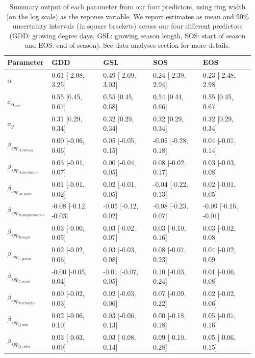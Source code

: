 \begin{table}[ht]
\centering
\caption{Summary output of each parameter from our four predictors, using ring width (on the log scale) as the reponse variable. We report estimates as mean and 90\% uncertainty intervals (in square brackets) across our four different predictors (GDD: growing degree days, GSL: growing season length, SOS: start of season and EOS: end of season). See data analyses section for more details.} 
\label{tab:tab_all}
\begin{tabular}{lllll}
  \hline
Parameter & GDD & GSL & SOS & EOS \\ 
  \hline
$\alpha$ & 0.61 [-2.08, 3.25] & 0.49 [-2.09, 3.03] & 0.24 [-2.39, 2.94] & 0.23 [-2.48, 2.98] \\ 
  $\sigma_{\alpha_{tree}}$ & 0.55 [0.45, 0.67] & 0.55 [0.45, 0.68] & 0.54 [0.44, 0.66] & 0.55 [0.45, 0.67] \\ 
  $\sigma_{y}$ & 0.31 [0.29, 0.34] & 0.32 [0.29, 0.34] & 0.32 [0.29, 0.34] & 0.32 [0.29, 0.34] \\ 
  $\beta_{spp_{A. rubrum}}$ & 0.00 [-0.06, 0.06] & 0.05 [-0.05, 0.15] & -0.05 [-0.28, 0.18] & 0.04 [-0.07, 0.14] \\ 
  $\beta_{spp_{A. saccharum}}$ & 0.03 [-0.01, 0.07] & 0.00 [-0.04, 0.05] & 0.08 [-0.02, 0.17] & 0.03 [-0.03, 0.08] \\ 
  $\beta_{spp_{Ae. flava}}$ & 0.01 [-0.01, 0.02] & 0.02 [-0.01, 0.05] & -0.04 [-0.22, 0.13] & 0.02 [-0.01, 0.05] \\ 
  $\beta_{spp_{B. alleghaniensis}}$ & -0.08 [-0.12, -0.03] & -0.05 [-0.12, 0.02] & -0.08 [-0.23, 0.07] & -0.09 [-0.16, -0.01] \\ 
  $\beta_{spp_{B. nigra}}$ & 0.03 [-0.00, 0.05] & 0.03 [-0.02, 0.07] & 0.03 [-0.10, 0.16] & 0.03 [-0.02, 0.08] \\ 
  $\beta_{spp_{C. glabra}}$ & 0.02 [-0.02, 0.06] & 0.03 [-0.03, 0.08] & 0.08 [-0.07, 0.23] & 0.04 [-0.02, 0.09] \\ 
  $\beta_{spp_{C. ovata}}$ & -0.00 [-0.05, 0.04] & -0.01 [-0.07, 0.05] & 0.10 [-0.03, 0.24] & 0.01 [-0.06, 0.08] \\ 
  $\beta_{spp_{P. deltoides}}$ & 0.00 [-0.02, 0.03] & 0.02 [-0.03, 0.06] & 0.07 [-0.09, 0.22] & 0.02 [-0.02, 0.06] \\ 
  $\beta_{spp_{Q. alba}}$ & 0.02 [-0.06, 0.10] & 0.03 [-0.06, 0.13] & 0.00 [-0.18, 0.18] & 0.05 [-0.07, 0.16] \\ 
  $\beta_{spp_{Q. rubra}}$ & 0.03 [-0.03, 0.09] & 0.03 [-0.08, 0.14] & 0.09 [-0.10, 0.28] & 0.05 [-0.06, 0.15] \\ 

\end{tabular}
\end{table}
